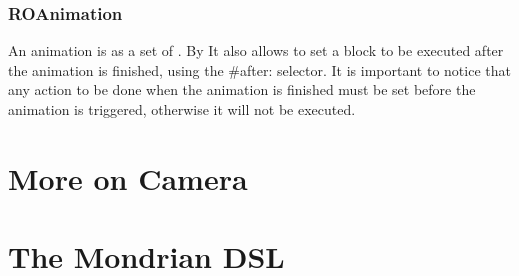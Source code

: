 \documentclass[a4paper,10pt,twoside]{book}
\begin{document}
%
%

\subsubsection*{ROAnimation}

An animation is as a set of .
By
It also allows to set a block to be executed after the animation is finished, using the \#after: selector. It is important to notice that any action to be done when the animation is finished must be set before the animation is triggered, otherwise it will not be executed.





\section{More on Camera}





\section{The Mondrian DSL}
\end{document}
